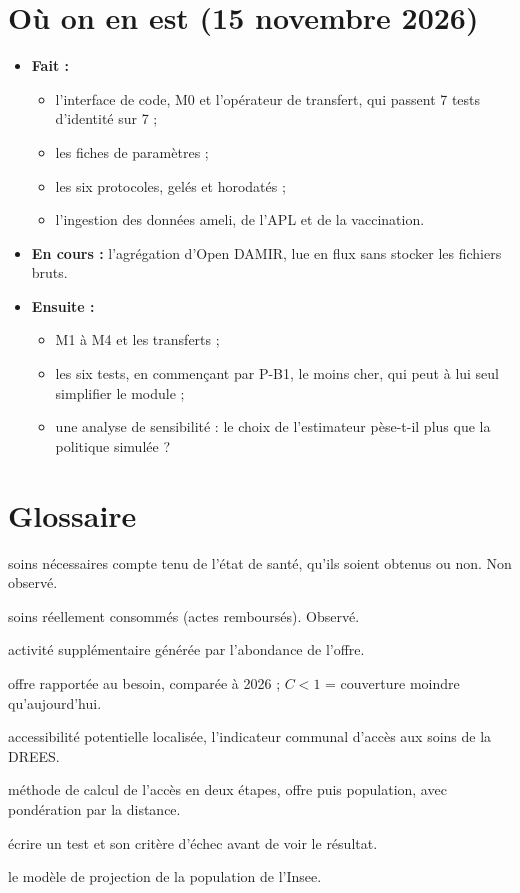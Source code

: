 \documentclass[11pt]{article}
\begin{document}
\section{Où on en est (15 novembre 2026)}
\begin{itemize}
  \item \textbf{Fait :}
    \begin{itemize}
      \item l'interface de code, M0 et l'opérateur de transfert, qui passent 7 tests d'identité sur 7 ;
      \item les fiches de paramètres ;
      \item les six protocoles, gelés et horodatés ;
      \item l'ingestion des données ameli, de l'APL et de la vaccination.
    \end{itemize}
  \item \textbf{En cours :} l'agrégation d'Open DAMIR, lue en flux sans stocker les fichiers bruts.
  \item \textbf{Ensuite :}
    \begin{itemize}
      \item M1 à M4 et les transferts ;
      \item les six tests, en commençant par P-B1, le moins cher, qui peut à lui seul simplifier le module ;
      \item une analyse de sensibilité : le choix de l'estimateur pèse-t-il plus que la politique simulée ?
    \end{itemize}
\end{itemize}

\section*{Glossaire}
\begin{description}[leftmargin=2.2cm,style=nextline]
  \item[Besoin] soins nécessaires compte tenu de l'état de santé, qu'ils soient obtenus ou non. Non observé.
  \item[Recours] soins réellement consommés (actes remboursés). Observé.
  \item[Demande induite] activité supplémentaire générée par l'abondance de l'offre.
  \item[Indice $C$] offre rapportée au besoin, comparée à 2026 ; $C<1$ = couverture moindre qu'aujourd'hui.
  \item[APL] accessibilité potentielle localisée, l'indicateur communal d'accès aux soins de la DREES.
  \item[2SFCA] méthode de calcul de l'accès en deux étapes, offre puis population, avec pondération par la distance.
  \item[Pré-enregistrement] écrire un test et son critère d'échec avant de voir le résultat.
  \item[Omphale] le modèle de projection de la population de l'Insee.
\end{description}



\end{document}
